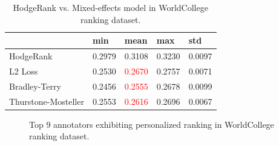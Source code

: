 \documentclass[10pt,journal,cspaper,compsoc]{IEEEtran}
\begin{document}
{\begin{table}[h]\caption{\label{tab:university} HodgeRank vs. Mixed-effects model in WorldCollege ranking dataset.}
\centering
\begin{tabular}{lllll}
 \hline     &min  &mean &max &std\\
 \hline  HodgeRank     &0.2979    &0.3108    &0.3230    &0.0097  \\
\hline  L2 Loss      &0.2530    &\textcolor{red}{0.2670}    &0.2757    &0.0071  \\
\hline Bradley-Terry     &0.2456    &\textcolor{red}{0.2555}    &0.2678    &0.0099 \\
\hline Thurstone-Mosteller      &0.2553    &\textcolor{red}{0.2616}    &0.2696    &0.0067  \\
 \hline
 \end {tabular}
\end{table}




\begin{figure}
 \begin{center}
  \caption{Top 9 annotators exhibiting personalized ranking in WorldCollege ranking dataset.}
\end{center}
\end{figure}






}
\end{document}
